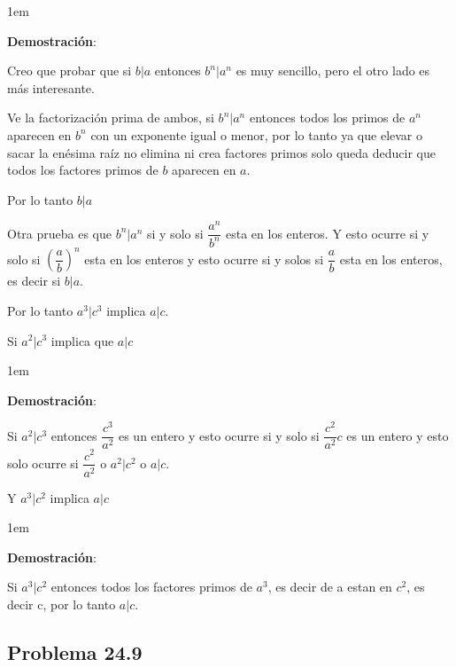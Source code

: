 \documentclass[12pt, fleqn]{article}                             %
\newenvironment{SmallIndentation}[1][0.75em]                    %
    {\begin{adjustwidth}{#1}{}\begin{footnotesize}}                 %
    {\end{footnotesize}\end{adjustwidth}}                           %
\newcommand{\Wrap}[1]{\left( #1 \right)}                        %
\newcommand{\pfrac}[2]{\Wrap{\dfrac{#1}{#2}}}                   %
\begin{document}
    \begin{SmallIndentation}[1em]
        \textbf{Demostración}:
        
        Creo que probar que si $b|a$ entonces $b^n|a^n$ es muy sencillo,
        pero el otro lado es más interesante.


        Ve la factorización prima de ambos, si $b^n|a^n$ entonces todos los primos
        de $a^n$ aparecen en $b^n$ con un exponente igual o menor, por lo tanto
        ya que elevar o sacar la enésima raíz no elimina ni crea factores primos
        solo queda deducir que todos los factores primos de $b$ aparecen en $a$.

        Por lo tanto $b|a$

        Otra prueba es que $b^n|a^n$ si y solo si $\dfrac{a^n}{b^n}$ esta en los enteros.
        Y esto ocurre si y solo si $\pfrac{a}{b}^n$ esta en los enteros y 
        esto ocurre si y solos si $\dfrac{a}{b}$ esta en los enteros, es decir
        si $b|a$.

    \end{SmallIndentation}


    Por lo tanto $a^3|c^3$ implica $a|c$.

    Si $a^2|c^3$ implica que $a|c$

    \begin{SmallIndentation}[1em]
        \textbf{Demostración}:
        
        Si $a^2|c^3$ entonces $\dfrac{c^3}{a^2}$ es un entero
        y esto ocurre si y solo si $\dfrac{c^2}{a^2} c$ es un entero
        y esto solo ocurre si $\dfrac{c^2}{a^2}$ o $a^2|c^2$ o $a|c$.
    
    \end{SmallIndentation}
        

    Y $a^3|c^2$ implica $a|c$

    \begin{SmallIndentation}[1em]
        \textbf{Demostración}:
        
        Si $a^3|c^2$ entonces todos los factores primos de $a^3$, es decir de
        a estan en $c^2$, es decir c, 
        por lo tanto $a|c$.
    
    \end{SmallIndentation}
        

    \subsection{Problema 24.9}
\end{document}
